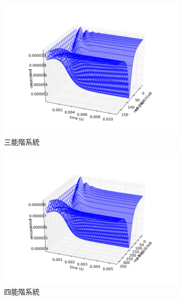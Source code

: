 \documentclass[11pt,a4paper]{article}
\begin{document}
 \begin{figure}[H]
 \centering
 \begin{subfigure}[b]{0.3\textwidth}
 \centering
 \includegraphics[width=\textwidth]{small_system/three_level_1000.pdf}
 \caption{三能階系統}
 \label{fig:three_level_result}
 \end{subfigure}
 \begin{subfigure}[b]{0.3\textwidth}
 \centering
 \includegraphics[width=\textwidth]{small_system/four_level_1000.pdf}
 \caption{四能階系統}
 \label{fig:four_level_result}
 \end{subfigure}
 \begin{subfigure}[b]{0.3\textwidth}
 \centering

\end{subfigure}
\end{figure}
\end{document}
